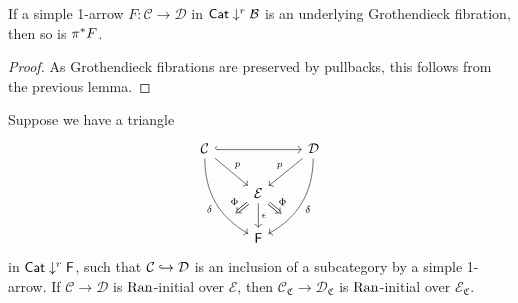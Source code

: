 \documentclass[a4paper,10pt
,draft
]{article}%
\renewcommand{\1}{\eta}%
\begin{document}
\begin{corollary}
      \label{PI_GFIB_COR}
      If a simple 1-arrow $F:\mathcal C \to \mathcal D$ in $\mathsf{Cat} \downarrow^r \mathcal B$
      is an underlying Grothendieck fibration,
      then so is $\pi^{\**}F$.
\end{corollary}
\begin{proof}
      As Grothendieck fibrations are preserved by pullbacks, this follows from the previous lemma.
\end{proof}

\begin{lemma}
      \label{RANINIT_PULL_LEM}
      Suppose we have a triangle
      \begin{equation}
            \begin{tikzcd}
                  \mathcal C \arrow[rr, hookrightarrow] \arrow[dr, "p"] \arrow[ddr, bend right, "\delta"', ""{near end, name = V}]
                  &&
                  \mathcal D \arrow[dl, "p"'] \arrow[ddl, bend left, "\delta", ""'{near end, name = B}]
                  \\
                  &
                  |[alias = A]| \mathcal E \arrow[d, "\epsilon"]
                  \\
                  &
                  \mathsf F
                  \arrow[Rightarrow, from = A, to = B, "\Phi"]
                  \arrow[Rightarrow, from = A, to = V, "\Phi"']
            \end{tikzcd}
      \end{equation}
      in $\mathsf{Cat} \downarrow^r \mathsf F$,
      such that $\mathcal C \hookrightarrow \mathcal D$ is an inclusion of a subcategory by a simple 1-arrow.
      If $\mathcal C \to \mathcal D$ is $\operatorname{Ran}$-initial over $\mathcal E$,
      then $\mathcal C_{\mathfrak C} \to \mathcal D_{\mathfrak C}$ is $\operatorname{Ran}$-initial over $\mathcal E_{\mathfrak C}$.
\end{lemma}
\end{document}
